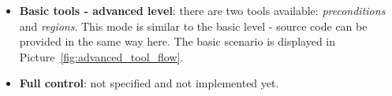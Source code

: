 \begin{itemize}
\item {\bf Basic tools - advanced level}: there are two tools
  available: \emph{preconditions} and \emph{regions}. This mode is
  similar to the basic level - source code can be provided in the same
  way here. The basic scenario is displayed in Picture~\ref{fig:advanced_tool_flow}.
  
  \item {\bf Full control}: not specified and not implemented yet.

\end{itemize}
